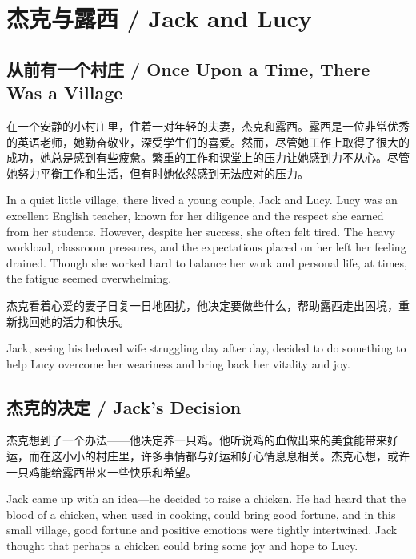 \chapter*{杰克与露西 / Jack and Lucy}

\section*{从前有一个村庄 / Once Upon a Time, There Was a Village}

在一个安静的小村庄里，住着一对年轻的夫妻，杰克和露西。露西是一位非常优秀的英语老师，她勤奋敬业，深受学生们的喜爱。然而，尽管她工作上取得了很大的成功，她总是感到有些疲惫。繁重的工作和课堂上的压力让她感到力不从心。尽管她努力平衡工作和生活，但有时她依然感到无法应对的压力。

\begin{flushright}
In a quiet little village, there lived a young couple, Jack and Lucy. Lucy was an excellent English teacher, known for her diligence and the respect she earned from her students. However, despite her success, she often felt tired. The heavy workload, classroom pressures, and the expectations placed on her left her feeling drained. Though she worked hard to balance her work and personal life, at times, the fatigue seemed overwhelming.
\end{flushright}

杰克看着心爱的妻子日复一日地困扰，他决定要做些什么，帮助露西走出困境，重新找回她的活力和快乐。

\begin{flushright}
Jack, seeing his beloved wife struggling day after day, decided to do something to help Lucy overcome her weariness and bring back her vitality and joy.
\end{flushright}

\section*{杰克的决定 / Jack's Decision}

杰克想到了一个办法——他决定养一只鸡。他听说鸡的血做出来的美食能带来好运，而在这小小的村庄里，许多事情都与好运和好心情息息相关。杰克心想，或许一只鸡能给露西带来一些快乐和希望。

\begin{flushright}
Jack came up with an idea—he decided to raise a chicken. He had heard that the blood of a chicken, when used in cooking, could bring good fortune, and in this small village, good fortune and positive emotions were tightly intertwined. Jack thought that perhaps a chicken could bring some joy and hope to Lucy.
\end{flushright}

